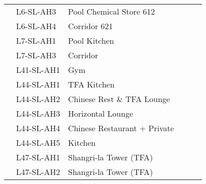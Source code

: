 \begin{table}[htbp]
\begin{tabular}{llp{3.2cm} c c l}
 
\midrule
\inc	 	 &L6-SL-AH3	 &Pool Chemical Store 612	 &\checkmark  && \\
\inc	 	 &L6-SL-AH4	 &Corridor 621	 	 	 &\checkmark & &\\
\midrule



\inc	 	 &L7-SL-AH1	 &Pool Kitchen	 	 	  &\checkmark  & &\\
 
\inc	 	 &L7-SL-AH3	 &Corridor	 	 	 &\checkmark  & &\\
\inc	 &L41-SL-AH1	 &Gym	 	 	  	 &\checkmark	 & &\\
\inc	 &L44-SL-AH1	 &TFA Kitchen	 	 	 &\checkmark& 	 & \\	 
\inc	 	 &L44-SL-AH2	 &Chinese Rest \& TFA Lounge	 &\checkmark	&  & \\ 	  	 	 
\inc	 	 &L44-SL-AH3	 &Horizontal Lounge	 	 	&\checkmark  & &\\	 	 
\inc	 	 &L44-SL-AH4	 &Chinese Restaurant + Private	&\checkmark&  & \\	 	 
\inc	 	 &L44-SL-AH5	 &Kitchen	 	 	  	&\checkmark 	& & \\ 
\midrule

\inc	 	 &L47-SL-AH1	 &Shangri-la Tower (TFA)	 	  	&\checkmark&	 &\\
\inc	 	 &L47-SL-AH2	 &Shangri-la Tower (TFA)	 		&\checkmark&	 &\\
\bottomrule
\end{tabular}

\end{table}



